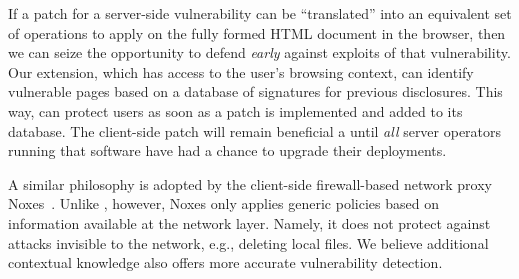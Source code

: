 If a patch for a server-side vulnerability can be ``translated'' into
an equivalent set of operations to apply on the fully formed HTML
document in the browser, then we can seize the opportunity to defend
{\em early} against exploits of that vulnerability.
%
Our extension, which has access to the user's browsing context, can
identify vulnerable pages based on a database of signatures for
previous disclosures. This way, \sys can protect users as soon as a patch
is implemented and added to its database. The client-side
patch will remain beneficial a until \textit{all} server
operators running that software have had a chance to upgrade their
deployments.


 A similar philosophy is adopted by the client-side firewall-based network proxy Noxes~\cite{Kirda:2009:CCS:2639535.2639808}. %
Unlike \sys, however, Noxes only applies generic policies based on information available at the network layer. Namely, it does not protect against
attacks invisible to the network, e.g., deleting local files.
We believe additional contextual knowledge also offers more accurate vulnerability detection.






